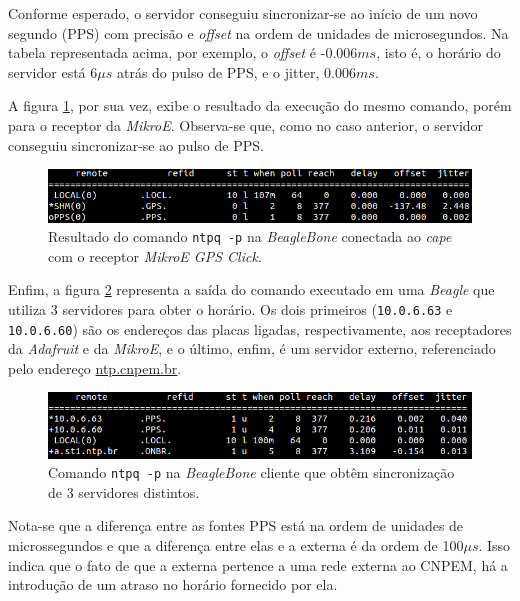 \FloatBarrier

Conforme esperado, o servidor conseguiu sincronizar-se ao início de um novo
segundo (PPS) com precisão e \textit{offset} na ordem de unidades de
microsegundos. Na tabela representada acima, por exemplo, o \textit{offset} é
-0.006\(ms\), isto é, o horário do servidor está 6\(\mu s\) atrás do pulso de
PPS, e o jitter, 0.006\(ms\).

\vspace{12pt}

A figura \ref{img:mikroe}, por sua vez, exibe o resultado da execução do mesmo
comando, porém para o receptor da \textit{MikroE}. Observa-se que, como no caso
anterior, o servidor conseguiu sincronizar-se ao pulso de PPS.  

\FloatBarrier

\begin{figure}[h]
    \centering
    \includegraphics[scale=0.6]{image/mikroe}
    \caption {Resultado do comando \texttt{ntpq -p} na
    \textit{BeagleBone} conectada ao \textit{cape} com o receptor \textit{MikroE
    GPS Click}.}  
    \label{img:mikroe} 
\end{figure} 

\FloatBarrier

Enfim, a figura \ref{img:cliente_ntp} representa a saída do comando executado em
uma \textit{Beagle} que utiliza 3 servidores para obter o horário. Os dois
primeiros (\texttt{10.0.6.63} e \texttt{10.0.6.60}) são os
endereços das placas ligadas, respectivamente, aos receptadores da
\textit{Adafruit} e da \textit{MikroE}, e o último, enfim, é um servidor
externo, referenciado pelo endereço \url{ntp.cnpem.br}. 

\FloatBarrier

\begin{figure}[h!]
    
    \centering
    \includegraphics[scale=0.6]{image/cliente-ntp}
    \caption {Comando \texttt{ntpq -p} na \textit{BeagleBone} cliente que obtêm sincronização de 3 servidores distintos.}
    \label{img:cliente_ntp} 
\end{figure} 

\FloatBarrier

Nota-se que a diferença entre as fontes PPS está na ordem de unidades de microssegundos e que a
diferença entre elas e a externa é da ordem de 100\(\mu s\). Isso indica que o
fato de que a externa pertence a uma rede externa ao CNPEM, há a introdução de
um atraso no horário fornecido por ela.
